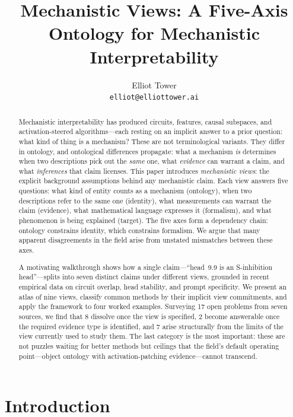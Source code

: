\documentclass{article}
\title{Mechanistic Views: A Five-Axis Ontology for Mechanistic Interpretability}
\author{
Elliot Tower \\
\texttt{elliot@elliottower.ai}
}
\begin{document}
\maketitle

\begin{abstract}
Mechanistic interpretability has produced circuits, features, causal
subspaces, and activation-steered algorithms---each resting on an
implicit answer to a prior question: what kind of thing is a mechanism?
These are not terminological variants.  They differ in ontology, and
ontological differences propagate: what a mechanism \emph{is} determines
when two descriptions pick out the \emph{same} one, what \emph{evidence}
can warrant a claim, and what \emph{inferences} that claim licenses.
This paper introduces \emph{mechanistic views}: the explicit background
assumptions behind any mechanistic claim.  Each view answers five
questions: what kind of entity counts as a mechanism (ontology), when
two descriptions refer to the same one (identity), what measurements
can warrant the claim (evidence), what mathematical language expresses
it (formalism), and what phenomenon is being explained (target).
The five axes form a dependency chain: ontology constrains identity,
which constrains formalism.  We argue that many apparent disagreements
in the field arise from unstated mismatches between these axes.

A motivating walkthrough shows how a single claim---``head~9.9
is an S-inhibition head''---splits into seven distinct claims under
different views, grounded in recent empirical data on circuit overlap,
head stability, and prompt specificity.
We present an atlas of nine views, classify common methods by their
implicit view commitments, and apply the framework to four worked
examples.  Surveying 17 open problems from seven sources, we find that
8 dissolve once the view is specified, 2 become answerable once the
required evidence type is identified, and 7 arise structurally from the
limits of the view currently used to study them.
The last category is the most important: these are not puzzles waiting
for better methods but ceilings that the field's default operating
point---object ontology with activation-patching evidence---cannot
transcend.
\end{abstract}


\section{Introduction}
\end{document}
